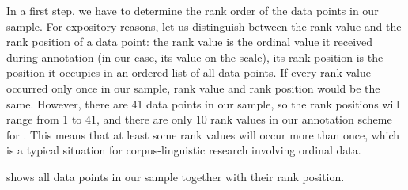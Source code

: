 In a first step, we have to determine the rank order of the data points in our sample. For expository reasons, let us distinguish between the rank value and the rank position of a data point: the rank value is the ordinal  value it received during annotation  (in our case, its value on the  scale), its rank position is the position it occupies in an ordered list of all data points. If every rank value occurred only once in our sample, rank value and rank position would be the same. However, there are 41 data points in our sample, so the rank positions will range from 1 to 41, and there are only 10 rank values in our annotation  scheme for .  This means that at least some rank values will occur more than once, which is a typical situation for corpus\hyp{}linguistic research involving ordinal  data.

 shows all data points in our sample together with their rank position.

